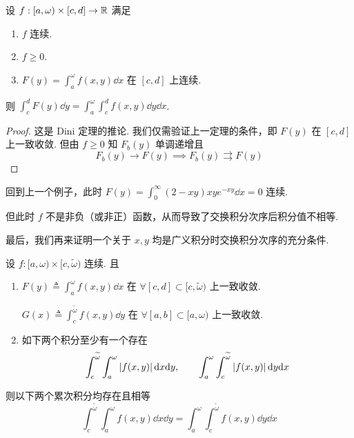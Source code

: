 \begin{property}
    设 $f:[a,\omega)\times [c,d]\to\mathbb{R}$ 满足

    \begin{enumerate}
        \item $f$ 连续.
        
        \item $f\ge 0$.
        
        \item $F(y)=\displaystyle\int_a^\omega f(x,y)\dd x$ 在 $[c,d]$ 上连续.
    \end{enumerate}

    则 $\displaystyle\int_c^dF(y)\dd y=\int_a^\omega\int_c^d f(x,y)\dd y\dd x$.
\end{property}
\begin{proof}
    这是 Dini 定理的推论. 我们仅需验证上一定理的条件，即 $F(y)$ 在 $[c,d]$ 上一致收敛. 但由 $f\ge 0$ 知 $F_b(y)$ 单调递增且
$$
F_b(y)\to F(y)\implies F_b(y)\rightrightarrows F(y)
$$
\end{proof}

\begin{hint}
    回到上一个例子，此时 $F(y)=\displaystyle\int_0^\infty (2-xy)xy e^{-xy}\dd x=0$ 连续.

    但此时 $f$ 不是非负（或非正）函数，从而导致了交换积分次序后积分值不相等.
\end{hint}

最后，我们再来证明一个关于 $x,y$ 均是广义积分时交换积分次序的充分条件.

\begin{property}
    设 $f:[a,\omega)\times[c,\widetilde{\omega})$ 连续. 且

    \begin{enumerate}
        \item $F(y)\triangleq\displaystyle\int_a^\omega f(x,y)\dd x$ 在 $\forall[c,d]\subset[c,\widetilde{\omega})$ 上一致收敛.
        
        $G(x)\triangleq\displaystyle\int_c^{\widetilde{\omega}} f(x,y)\dd y$ 在 $\forall[a,b]\subset[a,\omega)$ 上一致收敛.

        \item 如下两个积分至少有一个存在
$$
\int_c^{\widetilde{\omega}}\int_a^\omega\left\lvert{f(x,y)}\right\rvert\mathrm{d} x\mathrm{d} y,\qquad\int_a^\omega\int_c^{\widetilde{\omega}}\left\lvert{f(x,y)}\right\rvert\mathrm{d} y\mathrm{d} x
$$
    \end{enumerate}

    则以下两个累次积分均存在且相等
$$
\int_c^{\widetilde{\omega}}\int_a^\omega f(x,y)\dd x\dd y=\int_a^\omega\int_c^{\widetilde{\omega}}f(x,y)\dd y\dd x
$$
\end{property}